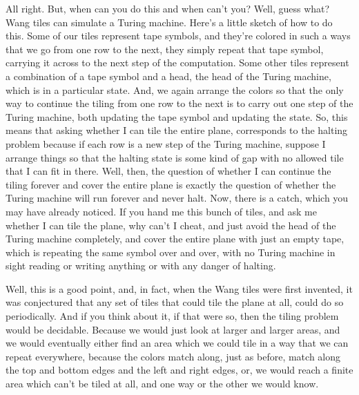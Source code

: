 \documentclass[]{article}
\begin{document}
All right.
But, when can you do this
and when can't you?
Well, guess what?
Wang tiles can simulate a Turing machine.
Here's a little sketch of how to do this.
Some of our tiles represent
tape symbols,
and they're colored in such a ways
that we go from one row to the next,
they simply repeat that tape symbol,
carrying it across to the next step
of the computation.
Some other tiles
represent a combination
of a tape symbol and a head,
the head of the Turing machine,
which is in a particular state.
And, we again arrange the colors
so that the only way to continue
the tiling from one row to the next
is to carry out one step
of the Turing machine,
both updating the tape symbol
and updating the state.
So, this means
that asking whether I can tile
the entire plane,
corresponds to the halting problem
because if each row is a new step
of the Turing machine,
suppose I arrange things so that
the halting state
is some kind of gap
with no allowed tile
that I can fit in there.
Well, then, the question of whether
I can continue the tiling forever
and cover the entire plane
is exactly the question of whether
the Turing machine will run forever
and never halt.
Now, there is a catch,
which you may have already noticed.
If you hand me this bunch of tiles,
and ask me whether I can tile the plane,
why can't I cheat,
and just avoid the head of the
Turing machine completely,
and cover the entire plane
with just an empty tape,
which is repeating the same symbol
over and over,
with no Turing machine in sight
reading or writing anything
or with any danger of halting.

Well, this is a good point,
and, in fact, when the Wang tiles
were first invented, it was conjectured
that any set of tiles
that could tile the plane at all,
could do so periodically.
And if you think about it,
if that were so,
then the tiling problem would be
decidable.
Because we would just look at
larger and larger areas,
and we would eventually
either find an area which we could tile
in a way that we can repeat everywhere,
because the colors match along,
just as before,
match along the top and bottom edges
and the left and right edges,
or,
we would reach a finite area
which can't be tiled at all,
and one way or the other
we would know.
\end{document}
